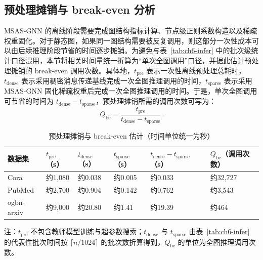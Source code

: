\subsection{预处理摊销与 break-even 分析}
\label{subsec:ch6-breakeven}

MSAS-GNN 的离线阶段需要完成图结构指标计算、节点级正则系数构造以及稀疏权重固化。对于静态图，如果同一图结构需要被反复调用，则这部分一次性成本可以由后续推理阶段节省的时间逐步摊销。为避免与表~\ref{tab:ch6-infer} 中的批次级统计口径混用，本节将相关时间量统一折算为“单次全图调用”口径，并据此估计预处理摊销的 break-even 调用次数。具体地，$t_{\text{pre}}$ 表示一次性离线预处理总耗时，$t_{\text{dense}}$ 表示采用稠密消息传递基线完成一次全图推理调用的时间，$t_{\text{sparse}}$ 表示采用 MSAS-GNN 固化稀疏权重后完成一次全图推理调用的时间。于是，单次全图调用可节省的时间为 $t_{\text{dense}}-t_{\text{sparse}}$，预处理摊销所需的调用次数可写为：
\begin{equation}
Q_{\text{be}}=\frac{t_{\text{pre}}}{t_{\text{dense}}-t_{\text{sparse}}}.
\label{eq:ch6-breakeven}
\end{equation}

\begin{table}[htbp]
  \centering
  \caption{预处理摊销与 break-even 估计（时间单位统一为秒）}
  \label{tab:ch6-breakeven}
  \begin{threeparttable}
    \begin{tabular}{>{\centering\arraybackslash}m{1.84cm}
                    >{\centering\arraybackslash}m{1.84cm}
                    >{\centering\arraybackslash}m{1.84cm}
                    >{\centering\arraybackslash}m{1.84cm}
                    >{\centering\arraybackslash}m{2.39cm}
                    >{\centering\arraybackslash}m{2.01cm}}
      \toprule
      \textbf{数据集} & \textbf{$t_{\text{pre}}$（s）} & \textbf{$t_{\text{dense}}$（s）} & \textbf{$t_{\text{sparse}}$（s）} & \textbf{$t_{\text{dense}}-t_{\text{sparse}}$（s）} & \textbf{$Q_{\text{be}}$（调用次数）} \\
      \midrule
      Cora & 约1,080 & 约0.038 & 约0.005 & 约0.033 & 约32,727 \\
      PubMed & 约2,700 & 约0.904 & 约0.142 & 约0.762 & 约3,543 \\
      ogbn-arxiv & 约9,000 & 约20.80 & 约1.41 & 约19.39 & 约464 \\
      \bottomrule
    \end{tabular}
    \begin{tablenotes}
      \item 注：$t_{\text{pre}}$ 不包含教师模型训练与超参数搜索；$t_{\text{dense}}$ 与 $t_{\text{sparse}}$ 由表~\ref{tab:ch6-infer} 的代表性批次时间按 $\lceil n/1024\rceil$ 的批次数折算得到，$Q_{\text{be}}$ 的单位为全图推理调用次数。
    \end{tablenotes}
  \end{threeparttable}
\end{table}

